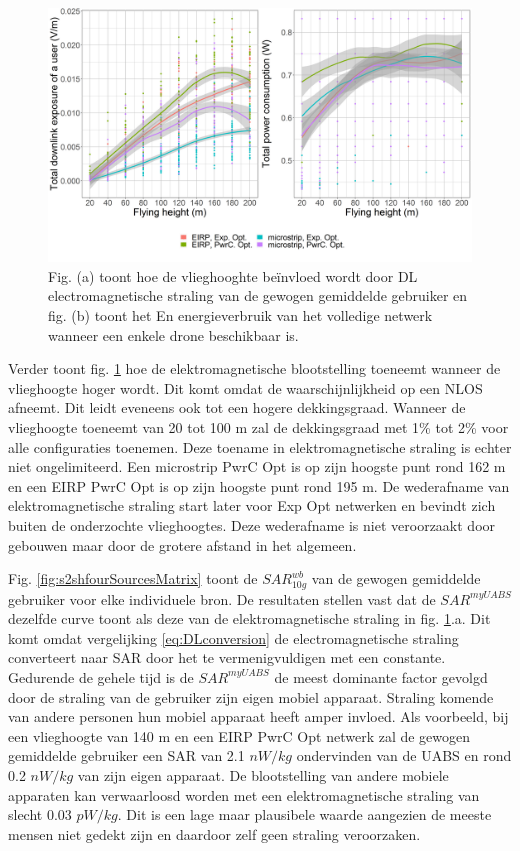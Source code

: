 \documentclass[twocolumn]{phdsymp_dutch}
\begin{document}
\begin{figure}[h!]
  \includegraphics[width=\linewidth]{s2/fhvsdlAndPc.png}
  \caption{Fig. (a) toont hoe de vlieghooghte be\"invloed wordt door \acs{DL} electromagnetische straling van de 
  gewogen gemiddelde gebruiker en fig. (b) toont het En energieverbruik van het volledige netwerk wanneer een enkele drone beschikbaar is.}
  \label{fig:s2a_dlAndPc}
\end{figure}

Verder toont fig.  \ref{fig:s2a_dlAndPc} hoe de elektromagnetische blootstelling toeneemt wanneer de vlieghoogte hoger wordt. 
Dit komt omdat de waarschijnlijkheid op een \gls{NLOS} afneemt.
Dit leidt eveneens ook tot een hogere dekkingsgraad.
Wanneer de vlieghoogte toeneemt van 20 tot 100 m zal de dekkingsgraad met 1\% tot 2\% voor alle configuraties toenemen.
Deze toename in elektromagnetische straling is echter niet ongelimiteerd. Een microstrip \gls{PwrC Opt}
is op zijn hoogste punt rond 162 m en een \gls{EIRP} \gls{PwrC Opt} is op zijn hoogste punt rond 195 m.
De wederafname van elektromagnetische straling start later voor \gls{Exp Opt} netwerken 
en bevindt zich buiten de onderzochte vlieghoogtes. 
Deze wederafname is niet veroorzaakt door gebouwen maar door de grotere afstand in het algemeen.

Fig. \ref{fig:s2shfourSourcesMatrix} toont de $SAR^{wb}_{10g}$ van de gewogen gemiddelde gebruiker voor elke individuele bron.
De resultaten stellen vast dat de $SAR^{myUABS}$ dezelfde curve toont als deze van de elektromagnetische straling in fig. \ref{fig:s2a_dlAndPc}.a. Dit komt omdat vergelijking \ref{eq:DLconversion} de electromagnetische straling converteert naar \gls{SAR}
door het te vermenigvuldigen met een constante. Gedurende de gehele tijd is de $SAR^{myUABS}$
de meest dominante factor gevolgd door de straling van de gebruiker zijn eigen mobiel apparaat.
Straling komende van andere personen hun mobiel apparaat heeft amper invloed.
Als voorbeeld, bij een vlieghoogte van 140 m en een \gls{EIRP} \gls{PwrC Opt} netwerk
zal de gewogen gemiddelde gebruiker een \gls{SAR} van
2.1 $nW/kg$ ondervinden van de  \gls{UABS} en rond
 0.2 $nW/kg$ van zijn eigen apparaat.
De blootstelling van andere mobiele apparaten kan verwaarloosd worden met een elektromagnetische straling van slecht
 0.03 $pW/kg$. Dit is een lage maar plausibele waarde aangezien de meeste mensen niet gedekt zijn 
en daardoor zelf geen straling veroorzaken.
\end{document}
